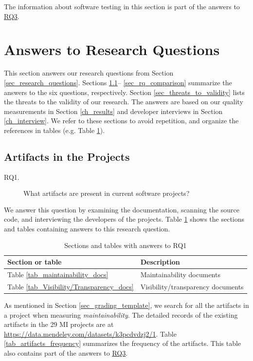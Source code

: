 \documentclass[preprint,12pt,authoryear]{elsarticle}
\begin{document}
The information about software testing in this section is part of the answers to
\hyperlink{rq3}{RQ3}.

\section{Answers to Research Questions} \label{ch_answers}

This section answers our research questions from Section
\ref{sec_research_questions}.  Sections \ref{sec_rq_artifacts}--
\ref{sec_rq_comparison} summarize the answers to the six questions,
respectively. Section \ref{sec_threats_to_validity} lists the threats to the
validity of our research. The answers are based on our quality measurements in
Section \ref{ch_results} and developer interviews in Section \ref{ch_interview}.
We refer to these sections to avoid repetition, and organize the references in
tables (e.g. Table \ref{tab_reference_rq1}).

\subsection{Artifacts in the Projects} \label{sec_rq_artifacts}
\begin{description}
\item[RQ1.] What artifacts are present in current software projects?
\end{description}

We answer this question by examining the documentation, scanning the source
code, and interviewing the developers of the projects. Table
\ref{tab_reference_rq1} shows the sections and tables containing answers to this
research question.

\begin{table}[ht]
\centering
\begin{tabular}{ll}
\hline
Section or table & Description \\ \hline
Table \ref{tab_maintainability_docs} & Maintainability documents \\
Table \ref{tab_Visibility/Transparency_docs} & Visibility/transparency documents \\ \hline
\end{tabular}
\caption{\label{tab_reference_rq1}Sections and tables with answers to RQ1}
\end{table}

As mentioned in Section \ref{sec_grading_template}, we search for all the
artifacts in a project when measuring \textit{maintainability}. The detailed
records of the existing artifacts in the 29 MI projects are at
\hyperlink{https://data.mendeley.com/datasets/k3pcdvdzj2/1}{https://data.mendeley.com/datasets/k3pcdvdzj2/1}.
Table \ref{tab_artifacts_frequency} summarizes the frequency of the artifacts.
This table also contains part of the answers to \hyperlink{rq3}{RQ3}.
\end{document}
